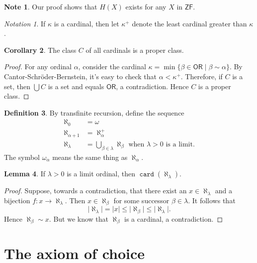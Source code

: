 \documentclass[10pt,letterpaper,cm]{nupset}
\theoremstyle{definition}
\newtheorem{definition}{Definition}[subsection]
\newtheorem{note}[definition]{Note}
\theoremstyle{theorem}
\newtheorem{lemma}[definition]{Lemma}
\newtheorem{corollary}[definition]{Corollary}
\theoremstyle{remark}
\newtheorem*{notation}{Notation}
\newcommand{\1}{\mathbf{1}}
\newcommand{\0}{\vec 0}
\newcommand{\zf}{\mathsf{ZF}}
\newcommand{\ord}{\mathsf{OR}}
\DeclareMathOperator{\card}{\mathtt{card}}
\begin{document}
\begin{note}
Our proof shows that $H(X)$ exists for any $X$ in $\zf$.
\end{note}

\begin{notation}
If $\kappa$ is a cardinal, then let $\kappa^+$ denote the least cardinal greater than $\kappa$. 
\end{notation}


\begin{corollary}
The class $C$ of all cardinals is a proper class.
\end{corollary}
\begin{proof}
For any ordinal $\alpha$, consider the cardinal $\kappa = \min\{\beta \in \ord \mid \beta \sim \alpha\}$. By Cantor-Schr\"oder-Bernstein, it's easy to check that $\alpha < \kappa^+$. Therefore,  if $C$ is a set, then $\bigcup{C}$ is a set and equals $\ord$, a contradiction. Hence $C$ is a proper class.
\end{proof}

\begin{definition}
By transfinite recursion, define the sequence
\begin{align*}
\aleph_0 & = \omega
\\ \aleph_{\alpha +1} & =\aleph_{\alpha}^+
\\ \aleph_{\lambda} & = \bigcup_{\beta \in \lambda} \aleph_{\beta} \text{ when }\lambda >0 \text{ is a limit.}
\end{align*}   The symbol $\omega_{\alpha}$ means the same thing as $\aleph_{\alpha}$.
\end{definition}

\begin{lemma}
If $\lambda >0$ is a limit ordinal, then $\card(\aleph_{\lambda})$.
\end{lemma}
\begin{proof}
Suppose, towards a contradiction, that there exist  an $x\in \aleph_{\lambda}$ and a bijection $f: x \to \aleph_{\lambda}$. Then $x\in \aleph_{\beta}$ for some successor $\beta \in \lambda$. It follows that $$\lvert{ \aleph_{\lambda}  }\rvert = \lvert{ x  }\rvert \leq \lvert{  \aleph_{\beta} }\rvert \leq \lvert{ \aleph_{\lambda}  }\rvert .$$ Hence $ \aleph_{\beta} \sim x$. But we know that $\aleph_{\beta} $ is a cardinal, a contradiction. 
\end{proof}

\section{The axiom of choice}
\end{document}

